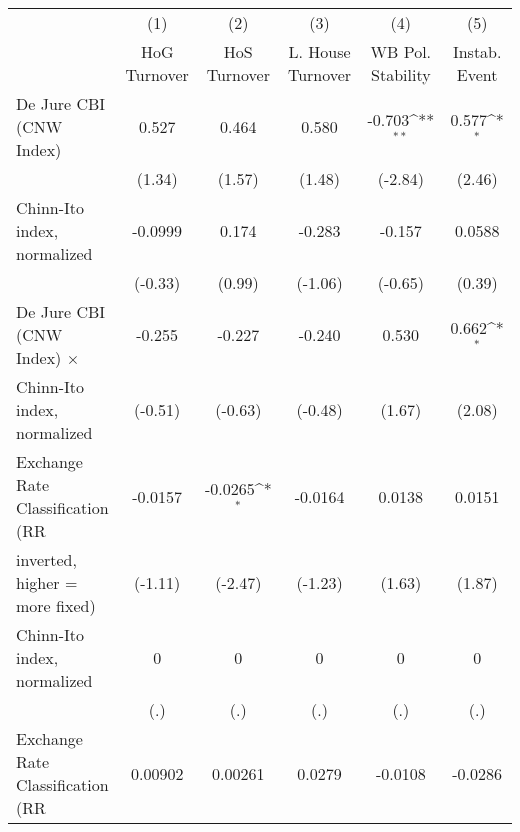 \begin{table}[htbp]\centering
\def\sym#1{\ifmmode^{#1}\else\(^{#1}\)\fi}
\caption{\label{ikmultIndFEDJ}}
\begin{tabular}{l*{5}{c}}
\toprule
                                        &\multicolumn{1}{c}{(1)}&\multicolumn{1}{c}{(2)}&\multicolumn{1}{c}{(3)}&\multicolumn{1}{c}{(4)}&\multicolumn{1}{c}{(5)}\\
                                        &\multicolumn{1}{c}{HoG Turnover}&\multicolumn{1}{c}{HoS Turnover}&\multicolumn{1}{c}{L. House Turnover}&\multicolumn{1}{c}{WB Pol. Stability}&\multicolumn{1}{c}{Instab. Event}\\
\midrule
De Jure CBI (CNW Index)                 &    0.527         &    0.464         &    0.580         &   -0.703\sym{**} &    0.577\sym{*}  \\
                                        &   (1.34)         &   (1.57)         &   (1.48)         &  (-2.84)         &   (2.46)         \\
\addlinespace
Chinn-Ito index, normalized             &  -0.0999         &    0.174         &   -0.283         &   -0.157         &   0.0588         \\
                                        &  (-0.33)         &   (0.99)         &  (-1.06)         &  (-0.65)         &   (0.39)         \\
\addlinespace
De Jure CBI (CNW Index) $\times$        &   -0.255         &   -0.227         &   -0.240         &    0.530         &    0.662\sym{*}  \\
Chinn-Ito index, normalized             &  (-0.51)         &  (-0.63)         &  (-0.48)         &   (1.67)         &   (2.08)         \\
\addlinespace
Exchange Rate Classification (RR        &  -0.0157         &  -0.0265\sym{*}  &  -0.0164         &   0.0138         &   0.0151         \\
inverted, higher = more fixed)          &  (-1.11)         &  (-2.47)         &  (-1.23)         &   (1.63)         &   (1.87)         \\
\addlinespace
Chinn-Ito index, normalized             &        0         &        0         &        0         &        0         &        0         \\
                                        &      (.)         &      (.)         &      (.)         &      (.)         &      (.)         \\
\addlinespace
Exchange Rate Classification (RR        &  0.00902         &  0.00261         &   0.0279         &  -0.0108         &  -0.0286         \\

\end{tabular}
\end{table}
